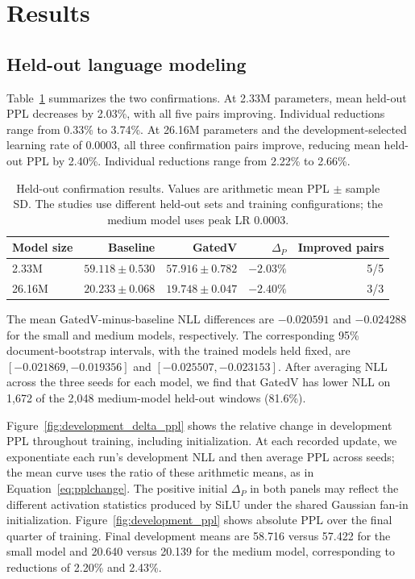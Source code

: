 \documentclass[11pt,a4paper]{article}
\begin{document}
\section{Results}
\label{sec:results}

\subsection{Held-out language modeling}
\label{sec:heldout}
Table~\ref{tab:confirmation} summarizes the two confirmations. At 2.33M parameters, mean held-out PPL decreases by 2.03\%, with all five pairs improving. Individual reductions range from 0.33\% to 3.74\%. At 26.16M parameters and the development-selected learning rate of 0.0003, all three confirmation pairs improve, reducing mean held-out PPL by 2.40\%. Individual reductions range from 2.22\% to 2.66\%.

\begin{table}[htbp]
\centering\small
\caption{Held-out confirmation results. Values are arithmetic mean PPL $\pm$ sample SD. The studies use different held-out sets and training configurations; the medium model uses peak LR 0.0003.}
\label{tab:confirmation}
\begin{tabular}{lrrrr}
\toprule
Model size & Baseline & GatedV & $\Delta_P$ & Improved pairs\\
\midrule
2.33M & $59.118\pm0.530$ & $57.916\pm0.782$ & $-2.03\%$ & 5/5\\
26.16M & $20.233\pm0.068$ & $19.748\pm0.047$ & $-2.40\%$ & 3/3\\
\bottomrule
\end{tabular}
\end{table}

The mean GatedV-minus-baseline NLL differences are $-0.020591$ and $-0.024288$ for the small and medium models, respectively. The corresponding 95\% document-bootstrap intervals, with the trained models held fixed, are $[-0.021869,-0.019356]$ and $[-0.025507,-0.023153]$. After averaging NLL across the three seeds for each model, we find that GatedV has lower NLL on 1,672 of the 2,048 medium-model held-out windows (81.6\%).

Figure~\ref{fig:development_delta_ppl} shows the relative change in development PPL throughout training, including initialization. At each recorded update, we exponentiate each run's development NLL and then average PPL across seeds; the mean curve uses the ratio of these arithmetic means, as in Equation~\ref{eq:pplchange}. The positive initial $\Delta_P$ in both panels may reflect the different activation statistics produced by SiLU under the shared Gaussian fan-in initialization. Figure~\ref{fig:development_ppl} shows absolute PPL over the final quarter of training. Final development means are 58.716 versus 57.422 for the small model and 20.640 versus 20.139 for the medium model, corresponding to reductions of 2.20\% and 2.43\%. 
\end{document}
